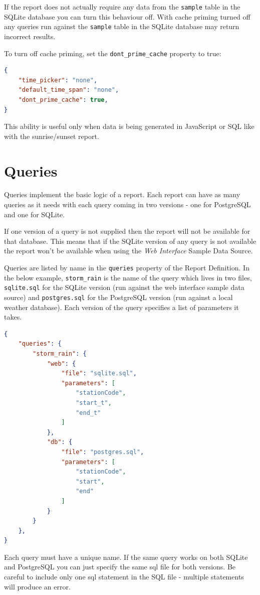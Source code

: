 \documentclass[a4paper,10pt]{book}
\begin{document}
If the report does not actually require any data from the \verb|sample| table in the SQLite database you can turn this behaviour off. With cache priming turned off any queries run against the \verb|sample| table in the SQLite database may return incorrect results.

To turn off cache priming, set the \verb|dont_prime_cache| property to true:
\begin{lstlisting}[language=json]
{
	"time_picker": "none",
	"default_time_span": "none",
	"dont_prime_cache": true,
}
\end{lstlisting}

This ability is useful only when data is being generated in JavaScript or SQL like with the sunrise/sunset report.

\chapter{Queries}
Queries implement the basic logic of a report. Each report can have as many queries as it needs with each query coming in two versions - one for PostgreSQL and one for SQLite. 

If one version of a query is not supplied then the report will not be available for that database. This means that if the SQLite version of any query is not available the report won't be available when using the \emph{Web Interface} Sample Data Source.

Queries are listed by name in the \verb|queries| property of the Report Definition. In the below example, \verb|storm_rain| is the name of the query which lives in two files, \verb|sqlite.sql| for the SQLite version (run against the web interface sample data source) and \verb|postgres.sql| for the PostgreSQL version (run against a local weather database). Each version of the query specifies a list of parameters it takes.
\begin{lstlisting}[language=json]
{
	"queries": {
		"storm_rain": {
			"web": {
				"file": "sqlite.sql",
				"parameters": [
					"stationCode",
					"start_t",
					"end_t"
				]
			},
			"db": {
				"file": "postgres.sql",
				"parameters": [
					"stationCode",
					"start",
					"end"
				]
			}
		}
	},
}
\end{lstlisting}
Each query must have a unique name. If the same query works on both SQLite and PostgreSQL you can just specify the same sql file for both versions. Be careful to include only one sql statement in the SQL file - multiple statements will produce an error.
\end{document}
